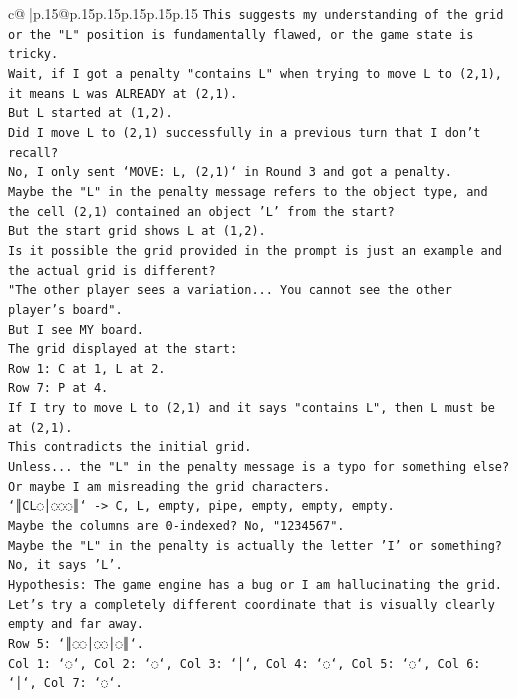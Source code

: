 \documentclass{article}
\begin{document}
{\begin{supertabular}{c@{$\;$}|p{.15\linewidth}@{}p{.15\linewidth}p{.15\linewidth}p{.15\linewidth}p{.15\linewidth}p{.15\linewidth}}
{{{\texttt{This suggests my understanding of the grid or the "L" position is fundamentally flawed, or the game state is tricky.} \\
\texttt{Wait, if I got a penalty "contains L" when trying to move L to (2,1), it means L was ALREADY at (2,1).} \\
\texttt{But L started at (1,2).} \\
\texttt{Did I move L to (2,1) successfully in a previous turn that I don't recall?} \\
\texttt{No, I only sent `MOVE: L, (2,1)` in Round 3 and got a penalty.} \\
\texttt{Maybe the "L" in the penalty message refers to the object type, and the cell (2,1) contained an object 'L' from the start?} \\
\texttt{But the start grid shows L at (1,2).} \\
\texttt{Is it possible the grid provided in the prompt is just an example and the actual grid is different?} \\
\texttt{"The other player sees a variation... You cannot see the other player's board".} \\
\texttt{But I see MY board.} \\
\texttt{The grid displayed at the start:} \\
\texttt{Row 1: C at 1, L at 2.} \\
\texttt{Row 7: P at 4.} \\
\texttt{If I try to move L to (2,1) and it says "contains L", then L must be at (2,1).} \\
\texttt{This contradicts the initial grid.} \\
\texttt{Unless... the "L" in the penalty message is a typo for something else? Or maybe I am misreading the grid characters.} \\
\texttt{`║CL◌│◌◌◌║` {-}> C, L, empty, pipe, empty, empty, empty.} \\
\texttt{Maybe the columns are 0{-}indexed? No, "1234567".} \\
\texttt{Maybe the "L" in the penalty is actually the letter 'I' or something? No, it says 'L'.} \\
\texttt{Hypothesis: The game engine has a bug or I am hallucinating the grid.} \\
\texttt{Let's try a completely different coordinate that is visually clearly empty and far away.} \\
\texttt{Row 5: `║◌◌│◌◌│◌║`.} \\
\texttt{Col 1: `◌`, Col 2: `◌`, Col 3: `│`, Col 4: `◌`, Col 5: `◌`, Col 6: `│`, Col 7: `◌`.} \\
}}}
\end{supertabular}}
\end{document}
